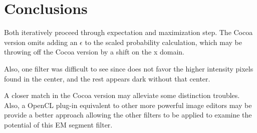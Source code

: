 \documentclass[]{article}
\begin{document}

\section{Conclusions} %
\label{sec:conclusions}

Both iteratively proceed through expectation and maximization step.  The Cocoa version omits adding an $\epsilon$ to the scaled probability calculation, which may be throwing off the Cocoa version by a shift on the x domain.


Also, one filter was difficult to see since does not favor the higher intensity pixels found in the center, and the rest appears dark without that center.

A closer match in the Cocoa version may alleviate some distinction troubles.  Also, a OpenCL plug-in equivalent to other more powerful image editors may be provide a better approach allowing the other filters to be applied to examine the potential of this EM segment filter. 




\end{document}

